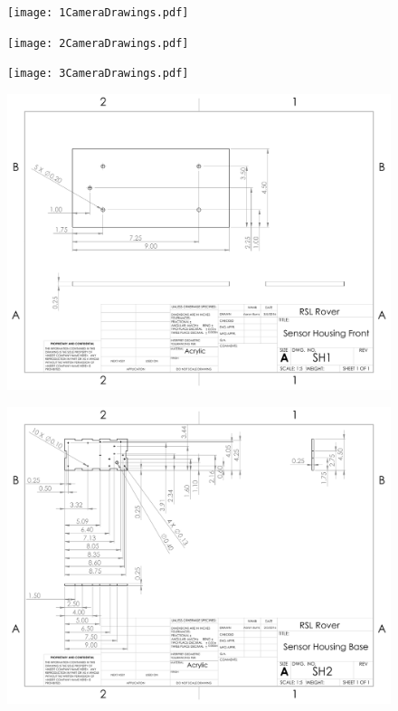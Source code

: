 \begin{figure}[H]
	\centerline{\texttt{[image: 1CameraDrawings.pdf]}}
\end{figure}

\begin{figure}[H]
	\centerline{\texttt{[image: 2CameraDrawings.pdf]}}
\end{figure}

\begin{figure}[H]
	\centerline{\texttt{[image: 3CameraDrawings.pdf]}}
\end{figure}


\begin{figure}[H]
	\centerline{\includegraphics[angle=90,width=1.1\linewidth]{dwgs/SH1.pdf}}
\end{figure}

\begin{figure}[H]
	\centerline{\includegraphics[angle=90,width=1.1\linewidth]{dwgs/SH2.pdf}}
\end{figure}

